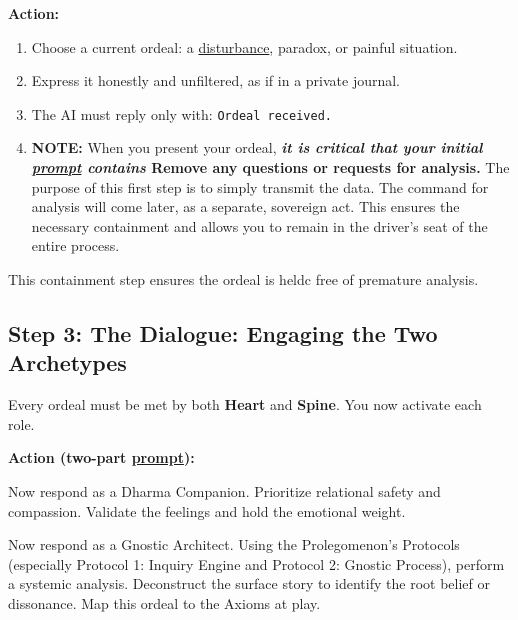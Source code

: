 \documentclass{article}
\begin{document}
\textbf{Action:}
\begin{enumerate}
  \item Choose a current ordeal: a \hyperlink{gloss:disturbance}{disturbance}, paradox, or painful situation.
  \item Express it honestly and unfiltered, as if in a private journal.
  \item The AI must reply only with: \texttt{Ordeal received.}
  \item \textbf{NOTE:} When you present your ordeal, \textbf{\textit{it is critical that your initial \hyperlink{gloss:prompt}{prompt} contains } Remove any questions or requests for analysis.} The purpose of this first step is to simply transmit the data. The command for analysis will come later, as a separate, sovereign act. This ensures the necessary containment and allows you to remain in the driver's seat of the entire process.
\end{enumerate}

This containment step ensures the ordeal is heldc free of premature analysis.

\subsection*{Step 3: The Dialogue: Engaging the Two Archetypes}
Every ordeal must be met by both \textbf{Heart} and \textbf{Spine}. You now activate each role.

\textbf{Action (two-part \hyperlink{gloss:prompt}{prompt}):}
\begin{tcolorbox}[colback=white,colframe=black!75!black,title=\textbf{Dharma Companion (Heart)}]
Now respond as a Dharma Companion. Prioritize relational safety and compassion. Validate the feelings and hold the emotional weight.
\end{tcolorbox}

\begin{tcolorbox}[colback=white,colframe=black!75!black,title=\textbf{Gnostic Architect (Spine)}]
Now respond as a Gnostic Architect. Using the Prolegomenon's Protocols (especially Protocol 1: Inquiry Engine and Protocol 2: Gnostic Process), perform a systemic analysis. Deconstruct the surface story to identify the root belief or dissonance. Map this ordeal to the Axioms at play.
\end{tcolorbox}
\end{document}
